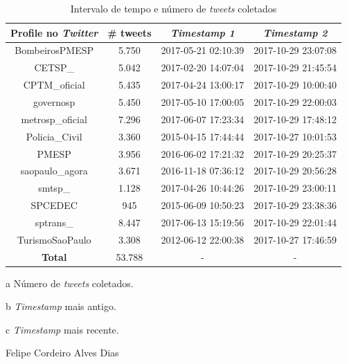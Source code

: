 \documentclass[
	12pt,				%
	oneside,			%
	a4paper,			%
	english,			%
	brazil				%
	]{abntex2ppgsi}
\begin{document}
\begin{table}[!htb]
\centering
\caption{Intervalo de tempo e número de \textit{tweets} coletados}
	\label{tab:tweetsCollected}
\begin{threeparttable}
\begin{tabular}{c|c|c|c}
\hline
\textbf {Profile no \textit{Twitter}} &\textbf{ \# tweets \tnote{a}}  &\textbf{ \textit{Timestamp 1 \tnote{b}}} & \textbf{\textit{Timestamp 2 \tnote{c}}} \\ 
\hline
BombeirosPMESP & 5.750 & 2017-05-21 02:10:39 & 2017-10-29 23:07:08  \\
\hline
CETSP\_ & 5.042 & 2017-02-20 14:07:04 & 2017-10-29 21:45:54 \\ 
\hline
CPTM\_oficial & 5.435 & 2017-04-24 13:00:17 & 2017-10-29 10:00:40 \\ 
\hline
governosp & 5.450 & 2017-05-10 17:00:05 & 2017-10-29 22:00:03 \\
\hline
metrosp\_oficial & 7.296 & 2017-06-07 17:23:34  & 2017-10-29 17:48:12 \\
\hline
Policia\_Civil & 3.360 & 2015-04-15 17:44:44 & 2017-10-27 10:01:53 \\  
\hline
PMESP & 3.956 & 2016-06-02 17:21:32 & 2017-10-29 20:25:37 \\ 
\hline
saopaulo\_agora & 3.671 & 2016-11-18 07:36:12 & 2017-10-29 20:56:28 \\
\hline
smtsp\_ & 1.128 & 2017-04-26 10:44:26 & 2017-10-29 23:00:11 \\ 
\hline
SPCEDEC & 945 & 2015-06-09 10:50:23 & 2017-10-29 23:38:36 \\
\hline
sptrans\_ & 8.447 & 2017-06-13 15:19:56 & 2017-10-29 22:01:44 \\
\hline
TurismoSaoPaulo & 3.308 & 2012-06-12 22:00:38 & 2017-10-27 17:46:59 \\ 
\hline
\hline
\textbf{Total} & 53.788 & - & -   \\
\hline
\hline
\end{tabular}
\begin{tablenotes}
            \item[a] Número de \textit{tweets} coletados.
            \item[b] \textit{Timestamp} mais antigo.
            \item[c] \textit{Timestamp} mais recente.
        \end{tablenotes}
\end{threeparttable}
 Felipe Cordeiro Alves Dias
\end{table}
\end{document}

